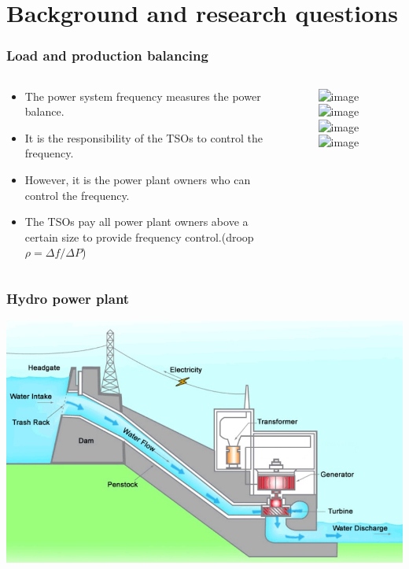\section{Background and research questions}
\begin{frame}
	\frametitle{Load and production balancing}
	\begin{columns}
		\begin{column}{0.5\textwidth}
			\begin{itemize}
				\item<1-> The power system frequency measures the power balance.
				\item<2-> It is the responsibility of the TSOs to control the frequency.
				\item<3-> However, it is the power plant owners who can control the frequency.
				\item<4-> The TSOs pay all power plant owners above a certain size to provide frequency control.(droop $\rho =\Delta f/\Delta P$)
			\end{itemize}
		\end{column}
		\begin{column}{0.5\textwidth}
			\begin{figure}
				\includegraphics<1>[width=0.8\textwidth]{./pictures/balance.png}
				\includegraphics<2>[width=0.8\textwidth]{./pictures/balance_statnett.png}
				\includegraphics<3>[width=0.8\textwidth]{./pictures/balance_producers.png}
				\includegraphics<4>[width=0.9\textwidth]{./pictures/speedDroop.tikz}
			\end{figure}
		\end{column}
	\end{columns}
\end{frame}
\begin{frame}
	\frametitle{Hydro power plant}
	\includegraphics[width=\textwidth]{./pictures/power_plant.png}
\end{frame}
